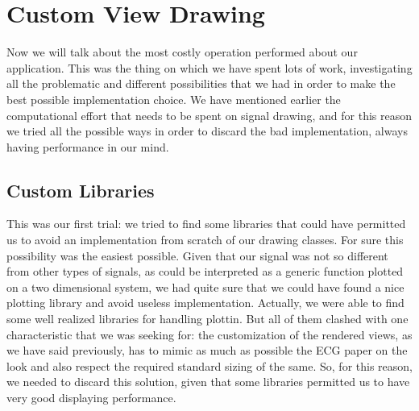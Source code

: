 \section{Custom View Drawing}
Now we will talk about the most costly operation performed about our application. This was the thing on which we have spent lots of work, investigating all the problematic and different possibilities that we had in order to make the best possible implementation choice. We have mentioned earlier the computational effort that needs to be spent on signal drawing, and for this reason we tried all the possible ways in order to discard the bad implementation, always having performance in our mind.

\subsection{Custom Libraries}
This was our first trial: we tried to find some libraries that could have permitted us to avoid an implementation from scratch of our drawing classes. For sure this possibility was the easiest possible. Given that our signal was not so different from other types of signals, as could be interpreted as a generic function plotted on a two dimensional system, we had quite sure that we could have found a nice plotting library and avoid useless implementation. Actually, we were able to find some well realized libraries for handling plottin. But all of them clashed with one characteristic that we was seeking for: the customization of the rendered views, as we have said previously, has to mimic as much as possible the ECG paper on the look and also respect the required standard sizing of the same. So, for this reason, we needed to discard this solution, given that some libraries permitted us to have very good displaying performance.

